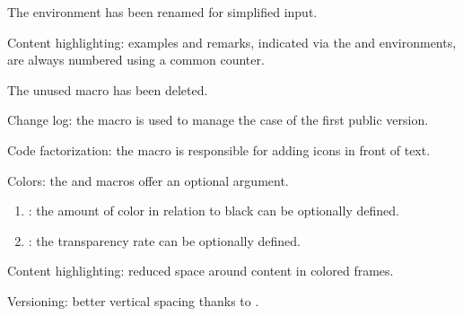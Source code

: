 \documentclass[10pt, a4paper]{tutodoc}
\begin{document}
\begin{tdocbreak}
    \item The  environment has been renamed  for simplified input.

    \item Content highlighting: examples and remarks, indicated via the  and  environments, are always numbered using a common counter.

    \item The unused macro  has been deleted.
\end{tdocbreak}


\begin{tdocnew}
    \item Change log: the  macro is used to manage the case of the first public version.

    \item Code factorization: the  macro is responsible for adding icons in front of text.
\end{tdocnew}


\begin{tdocupdate}
    \item Colors: the  and  macros offer an optional argument.
    \begin{enumerate}
        \item {} : the amount of color in relation to black can be optionally defined.

        \item {} : the transparency rate can be optionally defined.
    \end{enumerate}

    \item Content highlighting: reduced space around content in colored frames.

    \item Versioning: better vertical spacing thanks to .
\end{tdocupdate}
\end{document}
